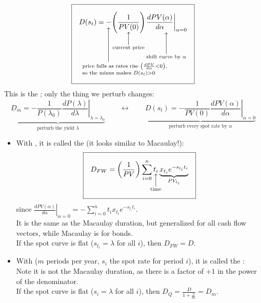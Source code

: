 \begin{definition}
    \[\boxed{D(s_t) = \underset{\substack{\left\uparrow\vphantom{\rule{0pt}{6.5ex}}\right.\\\mathrlap{\hspace{-1.3cm}\text{price falls as rates rise } \left(\frac{dPV}{d\alpha} < 0\right)\text{,}}\\\mathrlap{\hspace{-1.3cm}\text{so the minus makes } D(s_t) > 0}}}{-}\Bigg(\underset{\mathclap{\substack{\Big\uparrow\\\text{current price}}}}{\frac{1}{PV(0)}}\Bigg)\underset{\mathclap{\substack{\Bigg\uparrow\\\text{shift curve by } \alpha}}}{\left.\frac{dPV(\alpha)}{d\alpha}\right|_{\alpha = 0}}}\]
    This is the ; only the thing we perturb changes:
    \[\underbrace{D_m = -\frac{1}{P(\lambda_0)}\left.\frac{dP(\lambda)}{d\lambda}\right|_{\lambda = \lambda_0}}_{\text{perturb the yield } \lambda} \qquad\longleftrightarrow\qquad \underbrace{D(s_t) = -\frac{1}{PV(0)}\left.\frac{dPV(\alpha)}{d\alpha}\right|_{\alpha = 0}}_{\text{perturb every spot rate by } \alpha}\]
    \begin{itemize}
        \item With , it is called the  (it looks similar to Macaulay!):
        \[\boxed{D_{FW} = \left(\frac{1}{PV}\right)\sum_{i=0}^{n}\underset{\mathclap{\substack{\Big\uparrow\\\text{time}}}}{t_i}\underbrace{x_{t_i}e^{-s_{t_i}t_i}}_{PV_{t_i}}}\]
        since $\left.\frac{dPV(\alpha)}{d\alpha}\right|_{\alpha=0} = -\sum_{i=0}^{n}t_i x_{t_i}e^{-s_{t_i}t_i}$.
        \\It is the same as the Macaulay duration, but generalized for all cash flow vectors, while Macaulay is for bonds.
        \\If the spot curve is flat ($s_{t_i} = \lambda$ for all $i$), then $D_{FW} = D$.
        \item With  ($m$ periods per year, $s_i$ the spot rate for period $i$), it is called the :
        \\Note it is not the Macaulay duration, as there is a factor of $+1$ in the power of the denominator.
        \\If the spot curve is flat ($s_i = \lambda$ for all $i$), then $D_Q = \frac{D}{1+\frac{\lambda}{m}} = D_m$.
    \end{itemize}
\end{definition}

